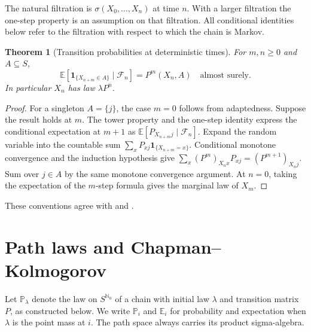 \documentclass[11pt,oneside,openany]{book}
\theoremstyle{plain}
\newtheorem{theorem}{Theorem}[chapter]
\theoremstyle{definition}
\theoremstyle{remark}
\begin{document}
The natural filtration is \(\sigma(X_0,\ldots,X_n)\) at time \(n\).
With a larger filtration the one-step property is an assumption
on that filtration. All conditional identities below refer to the
filtration with respect to which the chain is Markov.

\begin{theorem}[Transition probabilities at deterministic times]
For \(m,n\ge0\) and \(A\subseteq S\),
\[
 \mathbb E[\mathbf{1}_{\{X_{n+m}\in A\}}\mid\mathcal F_n]
     =P^m(X_n,A)\quad\text{almost surely}.
\]
In particular \(X_n\) has law \(\lambda P^n\).
\end{theorem}
\begin{proof}
For a singleton \(A=\{j\}\), the case \(m=0\) follows from
adaptedness. Suppose the result holds at \(m\). The tower property
and the one-step identity express the conditional expectation at
\(m+1\) as \(\mathbb E[P_{X_{n+m}j}\mid\mathcal F_n]\).
Expand the random variable into the countable sum
\(\sum_x P_{xj}\mathbf{1}_{\{X_{n+m}=x\}}\).
Conditional monotone convergence and the induction hypothesis
give \(\sum_x(P^m)_{X_nx}P_{xj}=(P^{m+1})_{X_nj}\).
Sum over \(j\in A\) by the same monotone convergence argument.
At \(n=0\), taking the expectation of the \(m\)-step formula
gives the marginal law of \(X_m\).
\end{proof}

These conventions agree with \cite[Sections 1.1--1.2]{Norris}
and \cite[Section 5.2]{Durrett}.

\section{Path laws and Chapman--Kolmogorov}\label{p207:W06}

Let \(\mathbb P_\lambda\) denote the law on \(S^{\mathbb N_0}\) of a
chain with initial law \(\lambda\) and transition matrix \(P\), as
constructed below. We write \(\mathbb P_i\) and \(\mathbb E_i\) for
probability and expectation when \(\lambda\) is the point mass at \(i\).
The path space always carries its product sigma-algebra.
\end{document}
